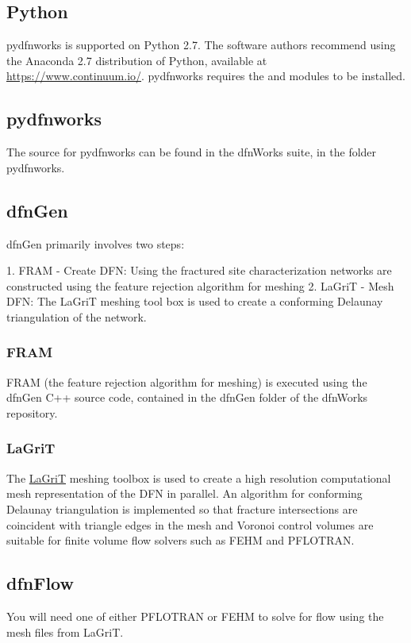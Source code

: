 \documentclass[letterpaper,10pt,english]{sphinxmanual}
\begin{document}
\subsection{Python}
\label{intro:python}
pydfnworks is supported on Python 2.7. The software authors recommend using
the Anaconda 2.7 distribution of Python, available at \href{https://www.continuum.io/}{https://www.continuum.io/}.
pydfnworks requires the  and  modules to be installed.


\subsection{pydfnworks}
\label{intro:pydfnworks}
The source for pydfnworks can be found in the dfnWorks suite, in the folder
pydfnworks.


\subsection{dfnGen}
\label{intro:dfngen}
dfnGen primarily involves two steps:

1. FRAM - Create DFN: Using the fractured site characterization networks are
constructed using the feature rejection algorithm for meshing
2. LaGriT - Mesh DFN: The LaGriT meshing tool box is used to create a
conforming Delaunay triangulation of the network.


\subsubsection{FRAM}
\label{intro:fram}
FRAM (the feature rejection algorithm for meshing) is executed using the
dfnGen C++ source code, contained in the dfnGen folder of the dfnWorks repository.


\subsubsection{LaGriT}
\label{intro:lagrit}
The \href{https://lagrit.lanl.gov}{LaGriT} meshing toolbox is used to create a high resolution computational
mesh representation of the DFN in parallel. An algorithm for conforming
Delaunay triangulation is implemented so that fracture intersections are
coincident with triangle edges in the mesh and Voronoi control volumes are
suitable for finite volume flow solvers such as FEHM and PFLOTRAN.


\subsection{dfnFlow}
\label{intro:dfnflow}\label{intro:id1}
You will need one of either PFLOTRAN or FEHM to solve for flow using the
mesh files from LaGriT.
\end{document}
